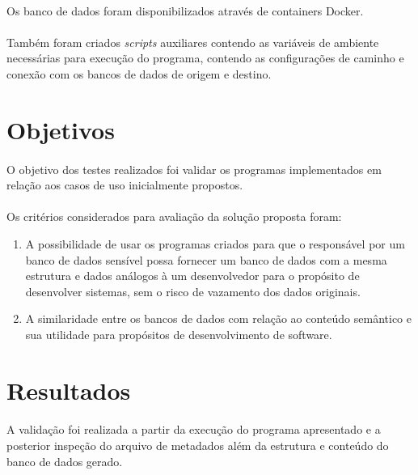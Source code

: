 \paragraph{} Os banco de dados foram disponibilizados através de containers Docker.

\paragraph{} Também foram criados \textit{scripts} auxiliares contendo as variáveis de ambiente necessárias para execução do programa, contendo as configurações de caminho e conexão com os bancos de dados de origem e destino.

\section{Objetivos}

\paragraph{} O objetivo dos testes realizados foi validar os programas implementados em relação aos casos de uso inicialmente propostos.

\paragraph{} Os critérios considerados para avaliação da solução proposta foram:

\begin{enumerate}
    \item A possibilidade de usar os programas criados para que o responsável por um banco de dados sensível possa fornecer um banco de dados com a mesma estrutura e dados análogos à um desenvolvedor para o propósito de desenvolver sistemas, sem o risco de vazamento dos dados originais.
    \item A similaridade entre os bancos de dados com relação ao conteúdo semântico e sua utilidade para propósitos de desenvolvimento de software.
\end{enumerate}

\section{Resultados}

\paragraph{} A validação foi realizada a partir da execução do programa apresentado e a posterior inspeção do arquivo de metadados além da estrutura e conteúdo do banco de dados gerado.

